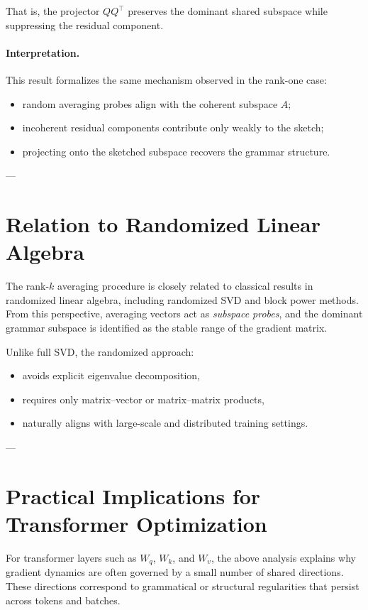 \documentclass[11pt]{report}
\begin{document}
That is, the projector $QQ^\top$ preserves the dominant shared subspace while
suppressing the residual component.

\paragraph{Interpretation.}
This result formalizes the same mechanism observed in the rank-one case:
\begin{itemize}
    \item random averaging probes align with the coherent subspace $A$;
    \item incoherent residual components contribute only weakly to the sketch;
    \item projecting onto the sketched subspace recovers the grammar structure.
\end{itemize}

---

\section{Relation to Randomized Linear Algebra}
\label{sec:rla_relation}

The rank-$k$ averaging procedure is closely related to classical results in
randomized linear algebra, including randomized SVD and block power methods.
From this perspective, averaging vectors act as \emph{subspace probes}, and the
dominant grammar subspace is identified as the stable range of the gradient matrix.

Unlike full SVD, the randomized approach:
\begin{itemize}
    \item avoids explicit eigenvalue decomposition,
    \item requires only matrix--vector or matrix--matrix products,
    \item naturally aligns with large-scale and distributed training settings.
\end{itemize}

---

\section{Practical Implications for Transformer Optimization}
\label{sec:practical_implications}

For transformer layers such as $W_q$, $W_k$, and $W_v$, the above analysis explains
why gradient dynamics are often governed by a small number of shared directions.
These directions correspond to grammatical or structural regularities that persist
across tokens and batches.
\end{document}
